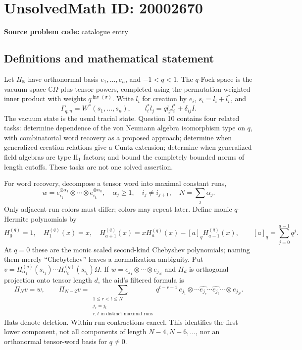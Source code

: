\documentclass[11pt]{article}
\newcommand{\R}{\mathbb{R}}
\newcommand{\C}{\mathbb{C}}
\begin{document}
\section*{UnsolvedMath ID: 20002670}
\textbf{Source problem code:} catalogue entry
\subsection{Definitions and mathematical statement}
Let \(H_\R\) have orthonormal basis \(e_1,\ldots,e_n\), and \(-1<q<1\). The \(q\)-Fock space is the vacuum space \(\C\Omega\) plus tensor powers, completed using the permutation-weighted inner product with weights \(q^{\operatorname{inv}(\sigma)}\). Write \(l_i\) for creation by \(e_i\), \(s_i=l_i+l_i^*\), and
\[
 \Gamma_{q,n}=W^*(s_1,\ldots,s_n),\qquad
 l_i^*l_j=q l_jl_i^*+\delta_{ij}I.
\]
The vacuum state is the usual tracial state. Question 10 contains four related tasks: determine dependence of the von Neumann algebra isomorphism type on \(q\), with combinatorial word recovery as a proposed approach; determine when generalized creation relations give a Cuntz extension; determine when generalized field algebras are type \(\mathrm{II}_1\) factors; and bound the completely bounded norms of length cutoffs. These tasks are not one solved assertion.

For word recovery, decompose a tensor word into maximal constant runs,
\[
 w=e_{i_1}^{\otimes\alpha_1}\otimes\cdots\otimes e_{i_k}^{\otimes\alpha_k},
 \quad\alpha_j\ge1,\quad i_j\ne i_{j+1},\quad N=\sum_j\alpha_j.
\]
Only adjacent run colors must differ; colors may repeat later. Define monic \(q\)-Hermite polynomials by
\[
 H_0^{(q)}=1,\quad H_1^{(q)}(x)=x,\quad
 H_{a+1}^{(q)}(x)=xH_a^{(q)}(x)-[a]_qH_{a-1}^{(q)}(x),
 \qquad[a]_q=\sum_{j=0}^{a-1}q^j.
\]
At \(q=0\) these are the monic scaled second-kind Chebyshev polynomials; naming them merely ``Chebytchev'' leaves a normalization ambiguity. Put \(v=H_{\alpha_1}^{(q)}(s_{i_1})\cdots H_{\alpha_k}^{(q)}(s_{i_k})\Omega\). If \(w=e_{j_1}\otimes\cdots\otimes e_{j_N}\) and \(\Pi_d\) is orthogonal projection onto tensor length \(d\), the aid's filtered formula is
\[
 \Pi_Nv=w,\qquad
 \Pi_{N-2}v=
 \sum_{\substack{1\le r<t\le N\\j_r=j_t\\r,t\text{ in distinct maximal runs}}}
 q^{t-r-1}\,
 e_{j_1}\otimes\cdots\widehat{e_{j_r}}\cdots\widehat{e_{j_t}}\cdots\otimes e_{j_N}.
\]
Hats denote deletion. Within-run contractions cancel. This identifies the first lower component, not all components of length \(N-4,N-6,\ldots\), nor an orthonormal tensor-word basis for \(q\ne0\).
\end{document}
